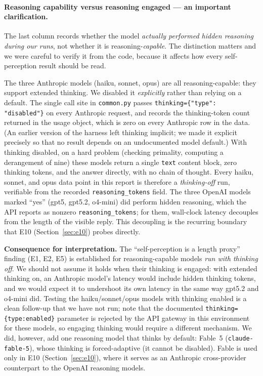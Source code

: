 \documentclass[11pt]{article}
\newcommand{\code}[1]{\texttt{\small #1}}
\begin{document}
\paragraph{Reasoning capability versus reasoning engaged --- an important clarification.} The
last column records whether the model \emph{actually performed hidden reasoning during our
runs}, not whether it is reasoning-\emph{capable}. The distinction matters and we were careful
to verify it from the code, because it affects how every self-perception result should be
read.

The three Anthropic models (haiku, sonnet, opus) are all reasoning-capable: they support
extended thinking. We disabled it \emph{explicitly} rather than relying on a default. The
single call site in \code{common.py} passes \code{thinking=\{"type": "disabled"\}} on every
Anthropic request, and records the thinking-token count returned in the usage object, which is
zero on every Anthropic row in the data. (An earlier version of the harness left thinking
implicit; we made it explicit precisely so that no result depends on an undocumented model
default.) With thinking disabled, on a hard problem (checking primality, computing a
derangement of nine) these models return a single \code{text} content block, zero thinking
tokens, and the answer directly, with no chain of thought. Every haiku, sonnet, and opus data
point in this report is therefore a \emph{thinking-off} run, verifiable from the recorded
\code{reasoning\_tokens} field. The three
OpenAI models marked ``yes'' (gpt5, gpt5.2, o4-mini) did perform hidden reasoning, which the
API reports as nonzero \code{reasoning\_tokens}; for them, wall-clock latency decouples from
the length of the visible reply. This decoupling is the recurring boundary that E10
(Section~\ref{sec:e10}) probes directly.

\textbf{Consequence for interpretation.} The ``self-perception is a length proxy'' finding
(E1, E2, E5) is established for reasoning-capable models \emph{run with thinking off}. We
should not assume it holds when their thinking is engaged: with extended thinking on, an
Anthropic model's latency would include hidden thinking tokens, and we would expect it to
undershoot its own latency in the same way gpt5.2 and o4-mini did. Testing the haiku/sonnet/opus models
with thinking enabled is a clean follow-up that we have not run; note that the documented
\code{thinking=\{type:enabled\}} parameter is rejected by the API gateway in this environment for
these models, so engaging thinking would require a different mechanism. We did, however, add one
reasoning model that thinks by default: Fable~5 (\code{claude-fable-5}), whose thinking is
forced-adaptive (it cannot be disabled). Fable is used only in E10 (Section~\ref{sec:e10}), where
it serves as an Anthropic cross-provider counterpart to the OpenAI reasoning models.
\end{document}
